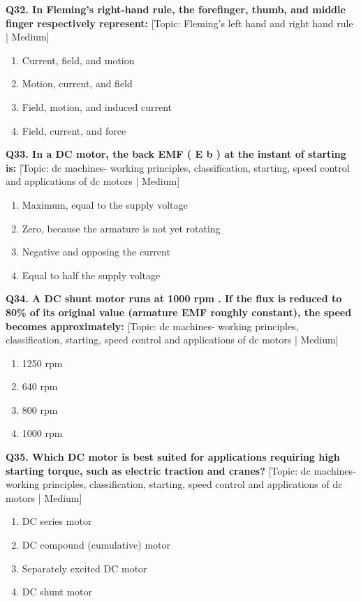 \noindent\textbf{Q32. In Fleming's right-hand rule, the forefinger, thumb, and middle finger respectively represent:} \hfill [Topic: Fleming's left hand and right hand rule | Medium]
\begin{enumerate}[label=(\alph*),topsep=2pt,itemsep=1pt,partopsep=0pt,parsep=0pt]
    \item {Current, field, and motion}
    \item {Motion, current, and field}
    \item {Field, motion, and induced current}
    \item {Field, current, and force}
\end{enumerate}
\vspace{2mm}

\noindent\textbf{Q33. In a DC motor, the back EMF ( E b ) at the instant of starting is:} \hfill [Topic: dc machines- working principles, classification, starting, speed control and applications of dc motors | Medium]
\begin{enumerate}[label=(\alph*),topsep=2pt,itemsep=1pt,partopsep=0pt,parsep=0pt]
    \item {Maximum, equal to the supply voltage}
    \item {Zero, because the armature is not yet rotating}
    \item {Negative and opposing the current}
    \item {Equal to half the supply voltage}
\end{enumerate}
\vspace{2mm}

\noindent\textbf{Q34. A DC shunt motor runs at 1000 rpm . If the flux is reduced to 80\% of its original value (armature EMF roughly constant), the speed becomes approximately:} \hfill [Topic: dc machines- working principles, classification, starting, speed control and applications of dc motors | Medium]
\begin{enumerate}[label=(\alph*),topsep=2pt,itemsep=1pt,partopsep=0pt,parsep=0pt]
    \item {1250 rpm}
    \item {640 rpm}
    \item {800 rpm}
    \item {1000 rpm}
\end{enumerate}
\vspace{2mm}

\noindent\textbf{Q35. Which DC motor is best suited for applications requiring high starting torque, such as electric traction and cranes?} \hfill [Topic: dc machines- working principles, classification, starting, speed control and applications of dc motors | Medium]
\begin{enumerate}[label=(\alph*),topsep=2pt,itemsep=1pt,partopsep=0pt,parsep=0pt]
    \item {DC series motor}
    \item {DC compound (cumulative) motor}
    \item {Separately excited DC motor}
    \item {DC shunt motor}
\end{enumerate}
\vspace{2mm}

